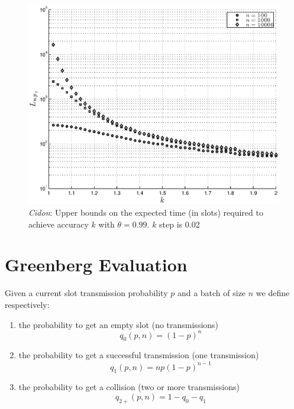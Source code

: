 \documentclass[12pt,a4paper]{report}
\begin{document}
\begin{figure}[htb!]
\begin{center}
\includegraphics[scale=0.7]{matlab/Cidon/cidon-k-L-minimum}
\caption[\emph{Cidon}: Upper bounds on the expected time (in slots) required to achieve accuracy $k$]{\emph{Cidon}: Upper bounds on the expected time (in slots) required to achieve accuracy $k$ with $\theta=0.99$. $k$ step is 0.02}
\label{cidon-k-L-minimum}
\end{center}
\end{figure}

\section{Greenberg Evaluation}
Given a current slot transmission probability $p$ and a batch of size $n$ we define respectively:
\begin{enumerate}
\item the probability to get an empty slot (no transmissions)
\begin{equation}q_{0}(p,n)=(1-p)^{n}\end{equation} 
\item the probability to get a successful transmission (one transmission)
\begin{equation}q_{1}(p,n)=n p (1-p)^{n-1} \end{equation} 
\item the probability to get a collision (two or more transmissions)
\begin{equation}q_{2+}(p,n)=1-q_{0}-q_{1}\end{equation}
\end{enumerate}
\end{document}
